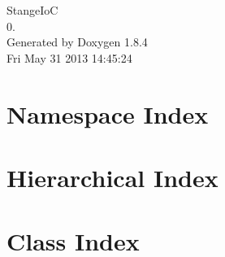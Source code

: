 \documentclass[twoside]{book}
\newcommand{\clearemptydoublepage}{%
  \newpage{\pagestyle{empty}\cleardoublepage}%
}
\begin{document}
\hypersetup{pageanchor=false}
\begin{titlepage}
\vspace*{7cm}
\begin{center}%
{\Large Stange\-Io\-C \\[1ex]\large 0. }\\
\vspace*{1cm}
{\large Generated by Doxygen 1.8.4}\\
\vspace*{0.5cm}
{\small Fri May 31 2013 14:45:24}\\
\end{center}
\end{titlepage}
\clearemptydoublepage
\tableofcontents
\clearemptydoublepage
{}
\hypersetup{pageanchor=true}

\chapter{Namespace Index}

\chapter{Hierarchical Index}

\chapter{Class Index}

\end{document}
